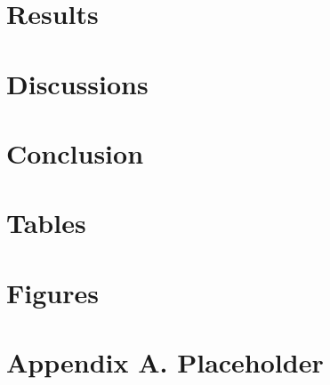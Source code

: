 \documentclass[12pt]{article}
\begin{document}
\section{Results} \label{sec:result}

\section{Discussions} \label{sec:discussion}

\section{Conclusion} \label{sec:conclusion}



\singlespacing
\setlength\bibsep{0pt}





\clearpage

\onehalfspacing

\section*{Tables} \label{sec:tab}



\clearpage

\section*{Figures} \label{sec:fig}





\clearpage

\section*{Appendix A. Placeholder} \label{sec:appendixa}
\end{document}
